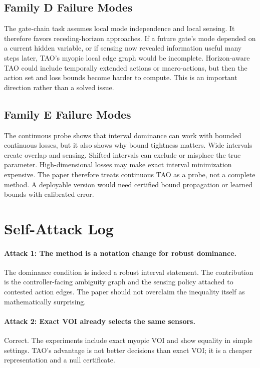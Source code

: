 \documentclass{article}
\begin{document}
\subsection{Family D Failure Modes}

The gate-chain task assumes local mode independence and local sensing. It therefore favors receding-horizon approaches. If a future gate's mode depended on a current hidden variable, or if sensing now revealed information useful many steps later, TAO's myopic local edge graph would be incomplete. Horizon-aware TAO could include temporally extended actions or macro-actions, but then the action set and loss bounds become harder to compute. This is an important direction rather than a solved issue.

\subsection{Family E Failure Modes}

The continuous probe shows that interval dominance can work with bounded continuous losses, but it also shows why bound tightness matters. Wide intervals create overlap and sensing. Shifted intervals can exclude or misplace the true parameter. High-dimensional losses may make exact interval minimization expensive. The paper therefore treats continuous TAO as a probe, not a complete method. A deployable version would need certified bound propagation or learned bounds with calibrated error.

\section{Self-Attack Log}

\paragraph{Attack 1: The method is a notation change for robust dominance.}
The dominance condition is indeed a robust interval statement. The contribution is the controller-facing ambiguity graph and the sensing policy attached to contested action edges. The paper should not overclaim the inequality itself as mathematically surprising.

\paragraph{Attack 2: Exact VOI already selects the same sensors.}
Correct. The experiments include exact myopic VOI and show equality in simple settings. TAO's advantage is not better decisions than exact VOI; it is a cheaper representation and a null certificate.
\end{document}
